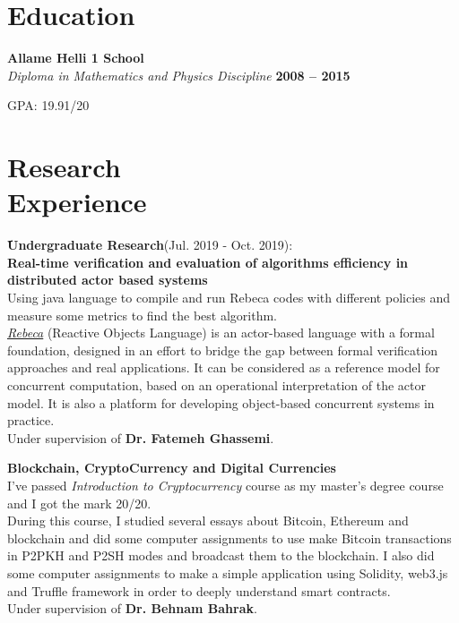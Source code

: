 \documentclass[line, mm]{sampleCV}
\begin{document}
\begin{resume}
\section{\mysidestyle Education}
\textbf{Allame Helli 1 School} \\
\textsl{Diploma in Mathematics and Physics Discipline} \hfill \textbf{ 2008 -- 2015}%
 \begin{list2}
	\item GPA: 19.91/20 \
	\end{list2}
	
	
	\section{\mysidestyle Research\\Experience} 
	
	\begin{list2}
	
	\item \textbf{َUndergraduate Research}(Jul. 2019 - Oct. 2019): \\
	\textbf{Real-time verification and evaluation of algorithms efficiency in distributed actor based systems}\\
	Using java language to compile and run Rebeca codes with different policies and measure some metrics to find the best algorithm.\\
	\href{http://rebeca-lang.org/}{\textit{Rebeca}} (Reactive Objects Language) is an actor-based language with a formal foundation, designed in an effort to bridge the gap between formal verification approaches and real applications. It can be considered as a reference model for concurrent computation, based on an operational interpretation of the actor model. It is also a platform for developing object-based concurrent systems in practice.\\
	Under supervision of \textbf{Dr. Fatemeh Ghassemi}.
	\\
	\item \textbf{Blockchain, CryptoCurrency and Digital Currencies}	\\
	I've passed \textit{Introduction to Cryptocurrency} course as my master's degree course and I got the mark 20/20. \\ 
	During this course, I studied several essays about Bitcoin, Ethereum and blockchain and did some computer assignments to use make Bitcoin transactions in P2PKH and P2SH modes and broadcast them to the blockchain.
	I also did some computer assignments to make a simple application using Solidity,  web3.js and Truffle framework in order to deeply understand smart contracts.\\
	Under supervision of \textbf{Dr. Behnam Bahrak}.
	\end{list2}




\end{resume}
\end{document}

